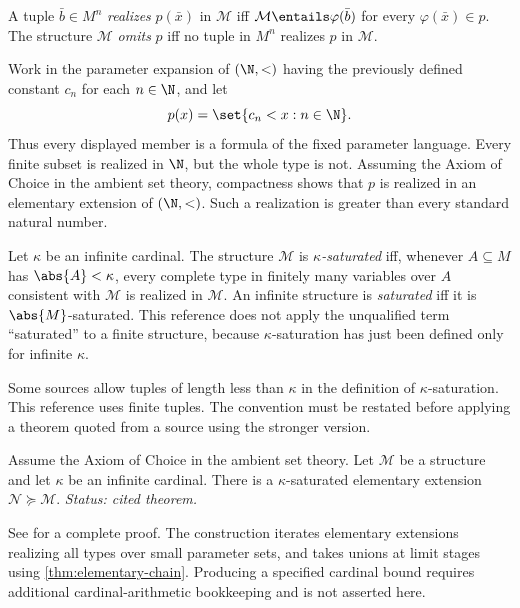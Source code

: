 \begin{definition}[Realization]
A tuple \(\bar b\in M^n\) \emph{realizes} \(p(\bar x)\) in
\(\mathcal M\) iff \(\mathcal M\entails\varphi(\bar b)\) for every
\(\varphi(\bar x)\in p\).  The structure \(\mathcal M\) \emph{omits}
\(p\) iff no tuple in \(M^n\) realizes \(p\) in \(\mathcal M\).
\end{definition}

\begin{example}
Work in the parameter expansion of \((\N,<)\) having the previously defined
constant \(c_n\) for each \(n\in\N\), and let
\[
  p(x)=\set{c_n<x:n\in\N}.
\]
Thus every displayed member is a formula of the fixed parameter language.
Every finite subset is realized in \(\N\), but
the whole type is not.  Assuming the Axiom of Choice in the ambient set theory,
compactness shows that \(p\) is realized in an elementary
extension of \((\N,<)\).  Such a realization is greater than every standard
natural number.
\end{example}

\begin{definition}[Saturation]
Let \(\kappa\) be an infinite cardinal.  The structure \(\mathcal M\) is
\emph{\(\kappa\)-saturated} iff, whenever \(A\subseteq M\) has
\(\abs{A}<\kappa\), every complete type in finitely many variables over
\(A\) consistent with \(\mathcal M\) is realized in \(\mathcal M\).
An infinite structure is \emph{saturated} iff it is
\(\abs{M}\)-saturated.  This reference does not apply the unqualified term
``saturated'' to a finite structure, because \(\kappa\)-saturation has just
been defined only for infinite \(\kappa\).
\end{definition}

\begin{remark}
Some sources allow tuples of length less than \(\kappa\) in the definition of
\(\kappa\)-saturation.  This reference uses finite tuples.  The convention must
be restated before applying a theorem quoted from a source using the stronger
version.
\end{remark}

\begin{theorem}
\label{thm:saturated-extension}
Assume the Axiom of Choice in the ambient set theory.  Let \(\mathcal M\) be a
structure and let \(\kappa\) be an infinite cardinal.
There is a \(\kappa\)-saturated elementary extension
\(\mathcal N\succcurlyeq\mathcal M\).
\textit{Status: cited theorem.}
\end{theorem}

See \cite{Marker2002} for a complete proof.
The construction iterates elementary extensions realizing all types over
small parameter sets, and takes unions at limit stages using
\cref{thm:elementary-chain}.  Producing a specified cardinal bound requires
additional cardinal-arithmetic bookkeeping and is not asserted here.

